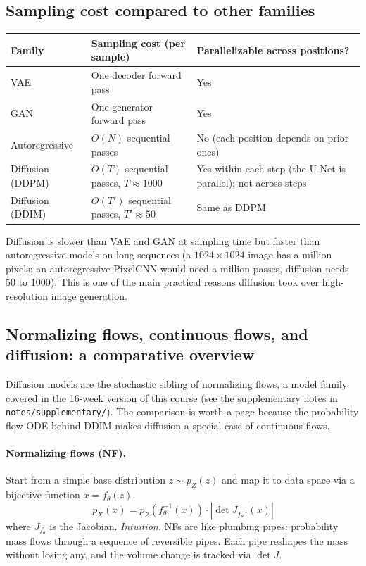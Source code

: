 \documentclass[11pt]{article}
\theoremstyle{remark}
\begin{document}
\subsection{Sampling cost compared to other families}

\begin{center}
\renewcommand{\arraystretch}{1.2}
\begin{tabularx}{\textwidth}{@{}l >{\raggedright\arraybackslash}X >{\raggedright\arraybackslash}X@{}}
\toprule
\textbf{Family} & \textbf{Sampling cost (per sample)} & \textbf{Parallelizable across positions?} \\
\midrule
VAE & One decoder forward pass & Yes \\
GAN & One generator forward pass & Yes \\
Autoregressive & $O(N)$ sequential passes & No (each position depends on prior ones) \\
Diffusion (DDPM) & $O(T)$ sequential passes, $T \approx 1000$ & Yes within each step (the U-Net is parallel); not across steps \\
Diffusion (DDIM) & $O(T')$ sequential passes, $T' \approx 50$ & Same as DDPM \\
\bottomrule
\end{tabularx}
\end{center}

Diffusion is slower than VAE and GAN at sampling time but faster than autoregressive models on long sequences (a $1024\times1024$ image has a million pixels; an autoregressive PixelCNN would need a million passes, diffusion needs 50 to 1000). This is one of the main practical reasons diffusion took over high-resolution image generation.

\subsection{Normalizing flows, continuous flows, and diffusion: a comparative overview}

Diffusion models are the stochastic sibling of normalizing flows, a model family covered in the 16-week version of this course (see the supplementary notes in \texttt{notes/supplementary/}). The comparison is worth a page because the probability flow ODE behind DDIM makes diffusion a special case of continuous flows.

\paragraph{Normalizing flows (NF).}
Start from a simple base distribution $z \sim p_Z(z)$ and map it to data space via a bijective function $x = f_\theta(z)$.
\begin{equation}
p_X(x) = p_Z(f_\theta^{-1}(x)) \cdot \left|\det J_{f_\theta^{-1}}(x)\right|
\label{eq:nf}
\end{equation}
where $J_{f_\theta}$ is the Jacobian.
\textit{Intuition.} NFs are like plumbing pipes: probability mass flows through a sequence of reversible pipes. Each pipe reshapes the mass without losing any, and the volume change is tracked via $\det J$.
\end{document}
